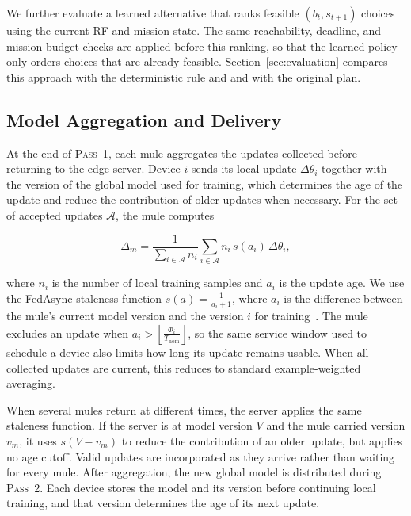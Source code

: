 \documentclass[conference]{IEEEtran}
\begin{document}
We further evaluate a learned alternative that ranks feasible
$(b_t,s_{t+1})$ choices using the current RF and mission state. The same
reachability, deadline, and mission-budget checks are applied before this
ranking, so that the learned
policy only orders choices that are already feasible. Section~\ref{sec:evaluation} compares this approach with
the deterministic rule and and with the original plan.

\subsection{Model Aggregation and Delivery}
\label{sec:aggregation}

At the end of \textsc{Pass~1}, each mule aggregates the updates collected before returning to the edge server. Device $i$ sends its local
update $\Delta\theta_i$ together with the version of the global model used for
training, which determines the age of the update and reduce
the contribution of older updates when necessary. For the set of accepted updates $\mathcal{A}$, the mule computes

\begin{equation}
\Delta_m =
\frac{1}{\sum_{i\in\mathcal{A}} n_i}
\sum_{i\in\mathcal{A}}
n_i\,s(a_i)\,\Delta\theta_i ,
\label{eq:mule-aggregation}
\end{equation}

where $n_i$ is the number of local training samples and $a_i$ is the update
age. We use the FedAsync staleness function $s(a)=\frac{1}{a_i+1}$,
where $a_i$ is the difference between the mule's current model version and the
version $i$ for training~\cite{xie2019asynchronous}. The mule
excludes an update when $
a_i >
\left\lfloor
\frac{\Phi_i}{T_{\mathrm{nom}}}
\right\rfloor$, so the same service window used to schedule a device also limits how long its
update remains usable. When all collected updates are current, this reduces to
standard example-weighted averaging.

When several mules return at different times, the server applies the same
staleness function. If the server is at model version $V$ and the mule carried
version $v_m$, it uses $s(V-v_m)$ to reduce the contribution of an
older update, but applies no age cutoff. Valid updates
are incorporated as they arrive rather than waiting for every mule. After aggregation, the new global model is distributed during
\textsc{Pass~2}. Each device stores the model and its version before continuing
local training, and that version determines the age of its next update.
\end{document}
